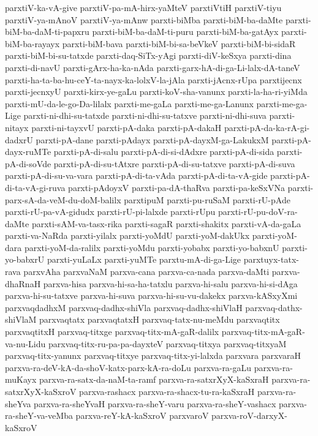 {parxtiV-ka-vA-give
parxtiV-pa-mA-hirx-yaMteV
parxtiVtiH
parxtiV-tiyu
parxtiV-ya-mAnoV
parxtiV-ya-mAnw
parxti-biMba
parxti-biM-ba-daMte
parxti-biM-ba-daM-ti-papxru
parxti-biM-ba-daM-ti-puru
parxti-biM-ba-gatAyx
parxti-biM-ba-rayayx
parxti-biM-bava
parxti-biM-bi-sa-beVkeV
parxti-biM-bi-sidaR
parxti-biM-bi-su-tatxde
parxti-daq-SiTx-yAgi
parxti-diV-keSxya
parxti-dina
parxti-di-navU
parxti-gArx-ha-ka-nAda
parxti-garx-hA-di-ga-Li-lalx-dA-taneV
parxti-ha-ta-ba-hu-ceY-ta-nayx-ka-lolxV-la-jAla
parxti-jAcnx-rUpa
parxtijecnx
parxti-jecnxyU
parxti-kirx-ye-gaLu
parxti-koV-sha-vanunx
parxti-la-ha-ri-yiMda
parxti-mU-da-le-go-Da-lilalx
parxti-me-gaLa
parxti-me-ga-Lanunx
parxti-me-ga-Lige
parxti-ni-dhi-su-tatxde
parxti-ni-dhi-su-tatxve
parxti-ni-dhi-suva
parxti-nitayx
parxti-ni-tayxvU
parxti-pA-daka
parxti-pA-dakaH
parxti-pA-da-ka-rA-gi-dadxrU
parxti-pA-dane
parxti-pAdayx
parxti-pA-dayxM-ga-LakukxM
parxti-pA-dayx-ruMTe
parxti-pA-di-salu
parxti-pA-di-si-dAdxre
parxti-pA-di-sida
parxti-pA-di-soVde
parxti-pA-di-su-tAtxre
parxti-pA-di-su-tatxve
parxti-pA-di-suva
parxti-pA-di-su-va-vara
parxti-pA-di-ta-vAda
parxti-pA-di-ta-vA-gide
parxti-pA-di-ta-vA-gi-ruva
parxti-pAdoyxV
parxti-pa-dA-thaRva
parxti-pa-keSxVNa
parxti-parx-sA-da-veM-du-doM-balilx
parxtipuM
parxti-pu-ruSaM
parxti-rU-pAde
parxti-rU-pa-vA-gidudx
parxti-rU-pi-lalxde
parxti-rUpu
parxti-rU-pu-doV-ra-daMte
parxti-sAM-va-tasx-rika
parxti-sagaR
parxti-shakitx
parxti-vA-da-gaLa
parxti-va-NaRda
parxti-yilalx
parxti-yoMdU
parxti-yoM-dakUkx
parxti-yoM-dara
parxti-yoM-da-ralilx
parxti-yoMdu
parxti-yobabx
parxti-yo-babxnU
parxti-yo-babxrU
parxti-yuLaLx
parxti-yuMTe
parxtu-mA-di-ga-Lige
parxtuyx-tatx-rava
parxvAha
parxvaNaM
parxva-cana
parxva-ca-nada
parxva-daMti
parxva-dhaRnaH
parxva-hisa
parxva-hi-sa-ha-tatxlu
parxva-hi-salu
parxva-hi-si-dAga
parxva-hi-su-tatxve
parxva-hi-suva
parxva-hi-su-vu-dakekx
parxva-kASxyXmi
parxvaqdadhxM
parxvaq-dadhx-shiVla
parxvaq-dadhx-shiVlaH
parxvaq-dathx-shiVlaM
parxvaqtatx
parxvaqtatxH
parxvaq-tatx-nu-meMdu
parxvaqtitx
parxvaqtitxH
parxvaq-titxge
parxvaq-titx-mA-gaR-dalilx
parxvaq-titx-mA-gaR-va-nu-Lidu
parxvaq-titx-ru-pa-pa-dayxteV
parxvaq-titxya
parxvaq-titxyaM
parxvaq-titx-yanunx
parxvaq-titxye
parxvaq-titx-yi-lalxda
parxvara
parxvaraH
parxva-ra-deV-kA-da-shoV-katx-parx-kA-ra-doLu
parxva-ra-gaLu
parxva-ra-muKayx
parxva-ra-satx-da-naM-ta-ramf
parxva-ra-satxrXyX-kaSxraH
parxva-ra-satxrXyX-kaSxroV
parxva-rashacx
parxva-ra-shacx-tu-ra-kaSxraH
parxva-ra-sheYva
parxva-ra-sheYvaH
parxva-ra-sheY-varu
parxva-ra-sheY-vashacx
parxva-ra-sheY-va-veMba
parxva-reY-kA-kaSxroV
parxvaroV
parxva-roV-darxyX-kaSxroV
}
